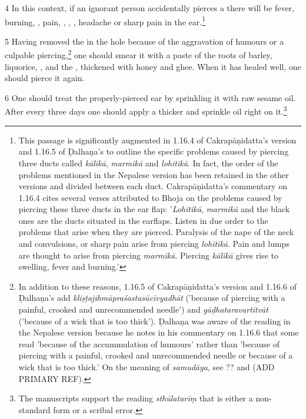 \begin{translation}
    \item [4] In this context, if an ignorant person accidentally pierces a 
     there will 
    be fever, burning, , pain, , 
    , 
    , headache or sharp pain in the ear.\footnote{This passage is significantly augmented in 1.16.4 of Cakrapāṇidatta's version \citep[126]{acar-1939} and 1.16.5 of Ḍalhaṇa's \citep[77]{vulgate} to outline the specific problems caused by piercing three ducts called \emph{kālikā}, \emph{marmikā} and \emph{lohitikā}. In fact, the order of the problems mentioned in the Nepalese version has been retained in the other versions and divided between each duct. Cakrapāṇidatta's commentary on 1.16.4 \citep[126]{acar-1939} cites several verses attributed to Bhoja on the problems caused by piercing these three ducts in the ear flap: '\emph{Lohitikā}, \emph{marmikā} and the black ones are the ducts situated in the earflaps.  Listen in due order to the problems that arise when they are pierced. Paralysis of the nape of the neck and convulsions, or sharp pain arise from piercing \emph{lohitikā}. Pain and lumps are thought to arise from piercing \emph{marmikā}. Piercing \emph{kālikā} gives rise to swelling, fever and burning.'}
    
    \item[5]     Having removed the  in the hole because of the aggravation of humours or a culpable piercing,\footnote{In addition to these reasons, 1.16.5 of Cakrapāṇidatta's version \citep[126–127]{acar-1939} and 1.16.6 of Ḍalhaṇa's \citep[77]{vulgate} add \emph{kliṣṭajihmāpraśastasūcīvyadhāt} ('because of piercing with a painful, crooked and unrecommended needle') and \emph{gāḍhataravartitvāt} ('because of a wick that is too thick'). Ḍalhaṇa was aware of the reading in the Nepalese version because he notes in his commentary on 1.16.6 \citep[77]{vulgate} that some read 'because of the accummulation of humours' rather than 'because of piercing with a painful, crooked and unrecommended needle or because of a wick that is too thick.' On the meaning of \emph{samudāya}, see ?? and \cite[1–5]{meul-1992} (ADD PRIMARY REF).} one should smear it with
    a paste of the roots of 
    barley, 
    liquorice, 
    , and the
    ,
    thickened with honey and ghee. When it has healed well, one should pierce it again.
    
    \item[6] One should treat the properly-pierced ear by sprinkling it with raw sesame
    oil.   After every three days one should apply a thicker  and
    sprinkle oil right on it.\footnote{The manuscripts support the reading
    \emph{sthūlatarīṃ} that is either a non-standard form or a scribal error.}
    

\end{translation}
